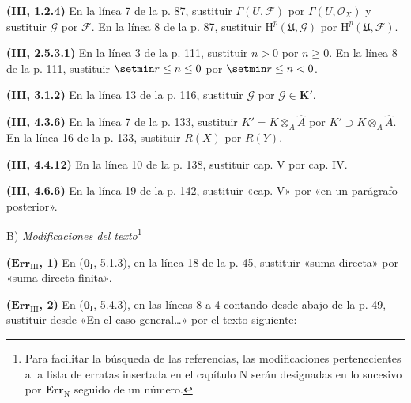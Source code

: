 \noindent\textbf{(III, 1.2.4)} En la línea 7 de la p. 87, sustituir
$\Gamma(U,\mathscr F)$ por $\Gamma(U,\mathscr O_X)$ y sustituir $\mathscr G$
por $\mathscr F$. En la línea 8 de la p. 87, sustituir
$\mathrm H^p(\mathfrak U,\mathscr G)$ por $\mathrm H^p(\mathfrak U,\mathscr F)$.

\noindent\textbf{(III, 2.5.3.1)} En la línea 3 de la p. 111, sustituir $n>0$
por $n\geq0$. En la línea 8 de la p. 111, sustituir $\setmin r\leq n\leq0$ por
$\setmin r\leq n<0$.

\noindent\textbf{(III, 3.1.2)} En la línea 13 de la p. 116, sustituir
$\mathscr G$ por $\mathscr G\in\boldsymbol{K}'$.

\noindent\textbf{(III, 4.3.6)} En la línea 7 de la p. 133, sustituir
$K'=K\otimes_A\widehat A$ por $K'\supset K\otimes_A\widehat A$. En la línea 16
de la p. 133, sustituir $R(X)$ por $R(Y)$.

\noindent\textbf{(III, 4.4.12)} En la línea 10 de la p. 138, sustituir cap. V
por cap. IV.

\noindent\textbf{(III, 4.6.6)} En la línea 19 de la p. 142, sustituir «cap. V»
por «en un parágrafo posterior».

\begin{center}
B) \emph{Modificaciones del texto}\footnote{Para facilitar la búsqueda de las
referencias, las modificaciones pertenecientes a la lista de erratas insertada
en el capítulo N serán designadas en lo sucesivo por $\mathbf{Err}_{\mathrm N}$
seguido de un número.}
\end{center}

\noindent\textbf{($\mathbf{Err}_{\mathrm{III}}$, 1)} En
($\mathbf{0}_{\mathrm I}$, 5.1.3), en la línea 18 de la p. 45, sustituir «suma directa»
por «suma directa finita».

\noindent\textbf{($\mathbf{Err}_{\mathrm{III}}$, 2)} En
($\mathbf{0}_{\mathrm I}$, 5.4.3), en las líneas 8 a 4 contando desde abajo de la p. 49,
sustituir desde «En el caso general\ldots{}» por el texto siguiente:

